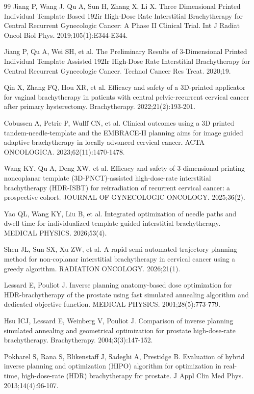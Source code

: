 \documentclass[12pt,twoside,letterpaper]{article}
\newcounter{algorithm}
\begin{document}
\begin{thebibliography}{99}
 Jiang P, Wang J, Qu A, Sun H, Zhang X, Li X. Three Dimensional Printed Individual Template Based 192ir High-Dose Rate Interstitial Brachytherapy for Central Recurrent Gynecologic Cancer: A Phase II Clinical Trial. Int J Radiat Oncol Biol Phys. 2019;105(1):E344-E344.

 Jiang P, Qu A, Wei SH, et al. The Preliminary Results of 3-Dimensional Printed Individual Template Assisted 192Ir High-Dose Rate Interstitial Brachytherapy for Central Recurrent Gynecologic Cancer. Technol Cancer Res Treat. 2020;19.

 Qin X, Zhang FQ, Hou XR, et al. Efficacy and safety of a 3D-printed applicator for vaginal brachytherapy in patients with central pelvic-recurrent cervical cancer after primary hysterectomy. Brachytherapy. 2022;21(2):193-201.

 Cobussen A, Petric P, Wulff CN, et al. Clinical outcomes using a 3D printed tandem-needle-template and the EMBRACE-II planning aims for image guided adaptive brachytherapy in locally advanced cervical cancer. ACTA ONCOLOGICA. 2023;62(11):1470-1478.

 Wang KY, Qu A, Deng XW, et al. Efficacy and safety of 3-dimensional printing noncoplanar template (3D-PNCT)-assisted high-dose-rate interstitial brachytherapy (HDR-ISBT) for reirradiation of recurrent cervical cancer: a prospective cohort. JOURNAL OF GYNECOLOGIC ONCOLOGY. 2025;36(2).

 Yao QL, Wang KY, Liu B, et al. Integrated optimization of needle paths and dwell time for individualized template-guided interstitial brachytherapy. MEDICAL PHYSICS. 2026;53(4).

 Shen JL, Sun SX, Xu ZW, et al. A rapid semi-automated trajectory planning method for non-coplanar interstitial brachytherapy in cervical cancer using a greedy algorithm. RADIATION ONCOLOGY. 2026;21(1).

 Lessard E, Pouliot J. Inverse planning anatomy-based dose optimization for HDR-brachytherapy of the prostate using fast simulated annealing algorithm and dedicated objective function. MEDICAL PHYSICS. 2001;28(5):773-779.

 Hsu ICJ, Lessard E, Weinberg V, Pouliot J. Comparison of inverse planning simulated annealing and geometrical optimization for prostate high-dose-rate brachytherapy. Brachytherapy. 2004;3(3):147-152.

 Pokharel S, Rana S, Blikenstaff J, Sadeghi A, Prestidge B. Evaluation of hybrid inverse planning and optimization (HIPO) algorithm for optimization in real-time, high-dose-rate (HDR) brachytherapy for prostate. J Appl Clin Med Phys. 2013;14(4):96-107.


\end{thebibliography}
\end{document}
